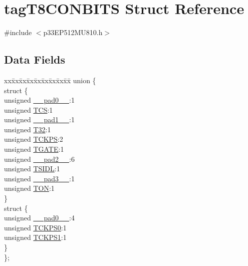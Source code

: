 \hypertarget{structtag_t8_c_o_n_b_i_t_s}{}\section{tag\+T8\+C\+O\+N\+B\+I\+TS Struct Reference}
\label{structtag_t8_c_o_n_b_i_t_s}


{\ttfamily \#include $<$p33\+E\+P512\+M\+U810.\+h$>$}

\subsection*{Data Fields}
\begin{DoxyCompactItemize}
\item 
\begin{tabbing}
xx\=xx\=xx\=xx\=xx\=xx\=xx\=xx\=xx\=\kill
union \{\\
\>struct \{\\
\>\>unsigned \hyperlink{structtag_t8_c_o_n_b_i_t_s_adf71f3d8410c1f1dbbc96680a92c49af}{\_\_pad0\_\_}:1\\
\>\>unsigned \hyperlink{structtag_t8_c_o_n_b_i_t_s_ab4daee3a10870ffba1c86d5020adb9b4}{TCS}:1\\
\>\>unsigned \hyperlink{structtag_t8_c_o_n_b_i_t_s_acaf2d0924a107ec6e8d2e31febaf66f9}{\_\_pad1\_\_}:1\\
\>\>unsigned \hyperlink{structtag_t8_c_o_n_b_i_t_s_a3bb4354090702842f0789980bb1cd45c}{T32}:1\\
\>\>unsigned \hyperlink{structtag_t8_c_o_n_b_i_t_s_a0d455d68434019feaabe9dfb64d75552}{TCKPS}:2\\
\>\>unsigned \hyperlink{structtag_t8_c_o_n_b_i_t_s_a35b6e4b591a8bd20e026168399eb0e6a}{TGATE}:1\\
\>\>unsigned \hyperlink{structtag_t8_c_o_n_b_i_t_s_a4d97cc5f7d51d22fc2bf3eab35c9cb7f}{\_\_pad2\_\_}:6\\
\>\>unsigned \hyperlink{structtag_t8_c_o_n_b_i_t_s_a4971b881615ef42703b5b78179fcda3d}{TSIDL}:1\\
\>\>unsigned \hyperlink{structtag_t8_c_o_n_b_i_t_s_ad7d7cee33e0c7f447abc4d171c628dd4}{\_\_pad3\_\_}:1\\
\>\>unsigned \hyperlink{structtag_t8_c_o_n_b_i_t_s_a8c2a094047d1019ce1c5b25ea8cff9b3}{TON}:1\\
\>\} \\
\>struct \{\\
\>\>unsigned \hyperlink{structtag_t8_c_o_n_b_i_t_s_adf71f3d8410c1f1dbbc96680a92c49af}{\_\_pad0\_\_}:4\\
\>\>unsigned \hyperlink{structtag_t8_c_o_n_b_i_t_s_a5cd4ef74604f5d88289a53f41cf38b7e}{TCKPS0}:1\\
\>\>unsigned \hyperlink{structtag_t8_c_o_n_b_i_t_s_ae190f2375c403c9fe8f5eb62a5bdf200}{TCKPS1}:1\\
\>\} \\
\}; \\

\end{tabbing}\end{DoxyCompactItemize}


